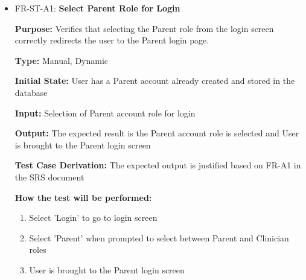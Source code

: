 \documentclass[12pt, titlepage]{article}
\begin{document}
\begin{itemize}
  \item FR-ST-A1: \textbf{Select Parent Role for Login}
  \begin{mdframed}[linewidth=0.5mm]
      \textbf{Purpose:} Verifies that selecting the Parent role from the login screen correctly redirects the user to the Parent login page. \par
      \textbf{Type:} Manual, Dynamic \par
      \textbf{Initial State:} User has a Parent account already created and stored in the database \par
      \textbf{Input:} Selection of Parent account role for login \par
      \textbf{Output:} The expected result is the Parent account role is selected and User is brought to the Parent login screen \par
      \textbf{Test Case Derivation:} The expected output is justified based on FR-A1 in the SRS document \par
      \textbf{How the test will be performed:}
      \begin{enumerate}[noitemsep]
        \item Select 'Login' to go to login screen
        \item Select 'Parent' when prompted to select between Parent and Clinician roles
        \item User is brought to the Parent login screen
      \end{enumerate}
  \end{mdframed}


\end{itemize}
\end{document}
